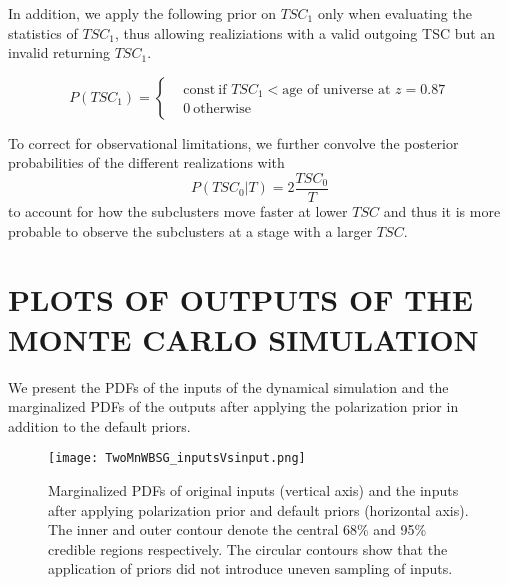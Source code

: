 In addition, we apply the following prior on $TSC_1$ only when evaluating the
statistics of $TSC_1$, thus allowing realiziations with a valid
outgoing TSC but an invalid returning $TSC_1$. 

\begin{equation}
	P(TSC_1) = 
	\begin{cases}
		& \text{const}~\text{if }TSC_1 < \text{age of universe at } z=0.87	\\
		& 0~\text{otherwise} \label{eqn:TSM_1}
	\end{cases}
\end{equation}

To correct for observational limitations, we further convolve the
posterior probabilities of the different realizations with 
\begin{equation}
	P(TSC_0 | T) = 2 \frac{TSC_0}{T}
\end{equation}
to account for how the subclusters move faster at lower $TSC$ and thus it
is more probable to observe the subclusters at a stage with a larger $TSC$.

\par 

%

\section{PLOTS OF OUTPUTS OF THE MONTE CARLO SIMULATION}
%

We present the PDFs of the inputs of the dynamical simulation and the
marginalized PDFs of the outputs after applying the polarization prior in
addition to the default priors.
\label{app: results}


\clearpage
\begin{figure*}
	\begin{minipage}{180mm}
	\begin{center}
	\texttt{[image: TwoMnWBSG\_inputsVsinput.png]}
	\caption{Marginalized PDFs of original inputs (vertical axis) and the inputs after
applying polarization prior and default priors (horizontal axis). The inner and outer contour
denote the central 68\% and 95\% credible regions respectively.
The circular contours show that the application of priors did not introduce
uneven sampling of inputs. }
	\end{center}
	\end{minipage}
\end{figure*}

